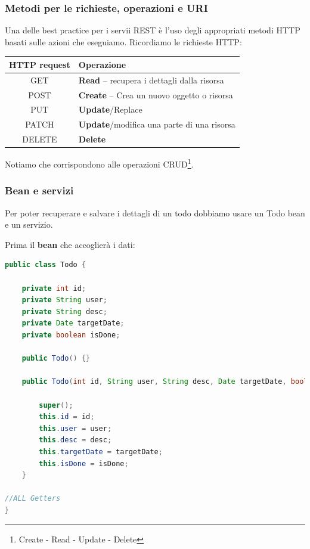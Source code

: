 \documentclass[11pt,a4paper]{book}
\begin{document}
\subsubsection{Metodi per le richieste, operazioni e URI}
Una delle best practice per i servii REST è l'uso degli appropriati metodi HTTP basati sulle azioni che eseguiamo. Ricordiamo le richieste HTTP:
\begin{table}[]
\begin{tabular}{|c|l|}
\hline
\multicolumn{1}{|l|}{\textbf{HTTP request}} & \textbf{Operazione}                       \\ \hline
GET                                         & \textbf{Read} -- recupera i dettagli dalla risorsa \\ \hline
POST                                        & \textbf{Create} -- Crea un nuovo oggetto o risorsa \\ \hline
PUT                                         & \textbf{Update}/Replace                            \\ \hline
PATCH                                       & \textbf{Update}/modifica una parte di una risorsa  \\ \hline
DELETE                                      & \textbf{Delete}                                    \\ \hline
\end{tabular}
\end{table}
Notiamo che corrispondono alle operazioni CRUD\footnote{Create - Read - Update - Delete}.

\subsubsection{Bean e servizi}
Per poter recuperare e salvare i dettagli di un todo dobbiamo usare un Todo bean e un servizio.

Prima il \textbf{bean} che accoglierà i dati:
\begin{lstlisting}[language = Java]
public class Todo {
	
	private int id;
	private String user;
	private String desc;
	private Date targetDate;
	private boolean isDone;
	
	public Todo() {}

	public Todo(int id, String user, String desc, Date targetDate, boolean isDone) {

		super();	
		this.id = id;
		this.user = user;
		this.desc = desc;
		this.targetDate = targetDate;
		this.isDone = isDone;
	}

//ALL Getters
}
\end{lstlisting}
\end{document}
